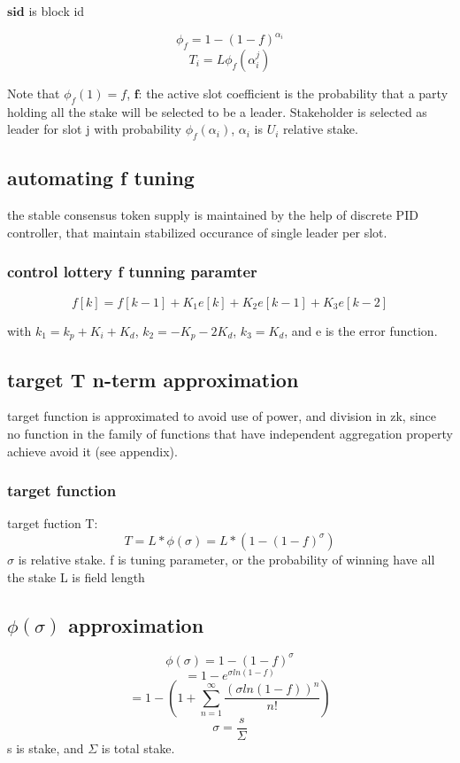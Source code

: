 \documentclass[a4paper]{article}
\begin{document}
$\textbf{sid}$ is block id

$$\phi_{f} = 1 - (1-f)^{\alpha_i}$$ $$T_{i} =
L \phi_{f}(\alpha_i^j)$$

Note that $\phi_f(1)=f$, $\textbf{f}$: the active slot coefficient is
the probability that a party holding all the stake will be selected to be
a leader. Stakeholder is selected as leader for slot j with probability
$\phi_f(\alpha_i)$, $\alpha_i$ is $U_i$ relative stake.


\subsection{ automating f tuning}

the stable consensus token supply is maintained by the help of discrete PID controller, that maintain stabilized occurance of single leader per slot.

\subsubsection{ control lottery f tunning paramter }

$$f[k] = f[k-1] + K_1e[k] + K_2e[k-1] + K_3e[k-2]$$

with $k_1 = k_p + K_i + K_d$,  $k_2 = -K_p -2K_d$,  $k_3 = K_d$, and e is the error function.


\subsection{ target T n-term approximation }
target function is approximated to avoid use of power, and division in zk, since no function in the family of functions that have independent aggregation property achieve avoid it (see appendix).

\subsubsection{ target function}

 target fuction T: $$ T = L * \phi(\sigma) = L * (1- (1 - f)^{\sigma}) $$
 $\sigma$ is relative stake.
 f is tuning parameter, or the probability of winning have all the stake
 L is field length

\subsection{ $\phi(\sigma)$ approximation}

 $$\phi(\sigma) = 1 - (1-f)^{\sigma} $$
 $$ = 1 - e^{\sigma ln(1-f)} $$
 $$ = 1 - (1 + \sum_{n=1}^{\infty}\frac{(\sigma ln (1-f))^n}{n!}) $$
 $$ \sigma = \frac{s}{\Sigma} $$
 s is stake, and $\Sigma$ is total stake.
\end{document}

